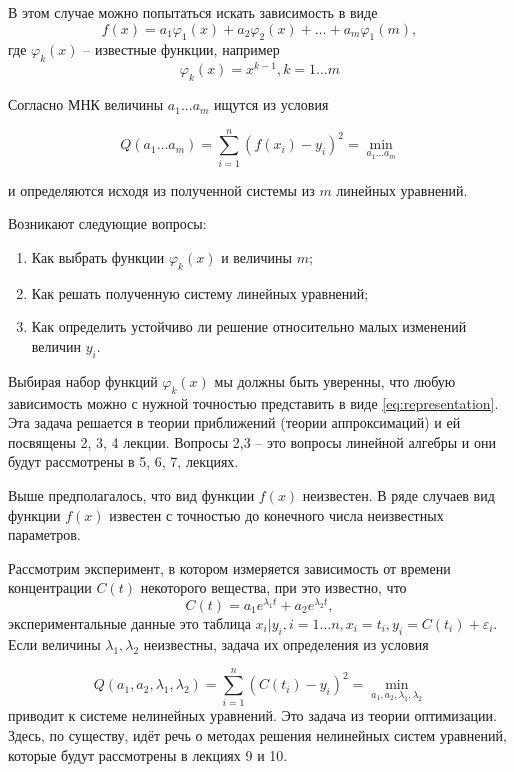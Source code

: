 В этом случае можно попытаться искать зависимость в виде 
\begin{equation} \label{eq:representation}
	f(x) = a_1 \varphi _1(x) + a_2 \varphi _2(x) + \dots + a_m \varphi _1(m),
\end{equation}
где $\varphi _k(x)$ -- известные функции, например
\begin{equation}
	\varphi _k(x) = x^{k-1},  k = 1 \dots m
\end{equation}

Согласно МНК величины $a_1 \dots a_m$ ищутся из условия

 \begin{equation}
	Q(a_1 \dots a_m) = \sum^n_{i=1}{(f(x_i) -y_i)^2} = \min_{a_1 \dots a_m}
\end{equation}

и определяются исходя из полученной системы из $m$ линейных уравнений.

Возникают следующие вопросы:
\begin{enumerate}
	\item Как выбрать функции $\varphi _k(x)$ и величины $m$;
	\item Как решать полученную систему линейных уравнений;
	\item Как определить устойчиво ли решение относительно малых изменений величин $y_i$.
\end{enumerate}


Выбирая набор функций $\varphi _k(x)$ мы должны быть уверенны, что любую зависимость можно с нужной точностью представить в виде \ref{eq:representation}. Эта задача решается в теории приближений (теории аппроксимаций) и ей посвящены 2, 3, 4 лекции. Вопросы 2,3 -- это вопросы линейной алгебры и они будут рассмотрены в 5, 6, 7, лекциях.

Выше предполагалось, что вид функции $f(x)$ неизвестен. В ряде случаев вид функции  $f(x)$ известен с точностью до конечного числа неизвестных параметров.

Рассмотрим эксперимент, в котором измеряется зависимость от времени концентрации $C(t)$ некоторого вещества, при это известно, что 
\begin{equation}
	C(t) = a_1e^{\lambda_1 t} + a_2 e^{\lambda_2 t},
\end{equation}
экспериментальные данные это таблица $x_i | y_i, i=1\dots n, x_i = t_i, y_i = C(t_i) + \varepsilon_i$. Если величины $\lambda_1, \lambda_2$ неизвестны, задача их определения из условия

 \begin{equation}
	Q(a_1,a_2,\lambda_1, \lambda_2) = \sum^n_{i=1}{(C(t_i) -y_i)^2} = \min_{a_1,a_2,\lambda_1, \lambda_2}
\end{equation}
приводит к системе нелинейных уравнений. Это задача из теории оптимизации. Здесь, по существу, идёт речь о методах решения нелинейных систем уравнений, которые будут рассмотрены в лекциях 9 и 10.

